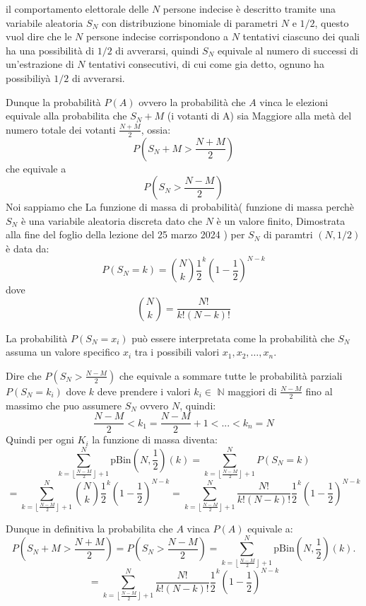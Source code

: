 \documentclass{article}
\begin{document}
il comportamento elettorale delle $N$ persone indecise è descritto tramite una variabile aleatoria $S_N$ con distribuzione binomiale di parametri $N$ e $1/2$, questo vuol dire che le $N$ persone indecise corrispondono a $N$ tentativi ciascuno dei quali ha una possibilità di  $1/2$ di avverarsi, quindi $S_N$ equivale al numero di successi di un'estrazione di $N$ tentativi consecutivi, di cui come gia detto, ognuno ha possibiliyà $1/2$ di avverarsi.

Dunque la probabilità $P(A)$ ovvero la probabilità che $A$ vinca le elezioni  equivale alla probabilita che $ S_N + M$ (i votanti di A) sia
Maggiore alla metà del numero totale dei votanti $\frac{N + M}{2}$, ossia:
\[
P\left( S_N + M > \frac{N + M}{2} \right)
\]
che equivale a
\[
 P\left( S_N > \frac{N - M}{2} \right)
\]
Noi sappiamo che La funzione di massa di probabilità( funzione di massa perchè $S_N$ è una variabile aleatoria discreta dato che $N$ è un valore finito, Dimostrata alla fine del foglio della lezione del 25 marzo 2024 ) per $S_N$ di paramtri $(N,1/2)$ è data da:
\[
P(S_N = k) = \binom{N}{k} \frac{1}{2}^k (1-\frac{1}{2})^{N-k}
\]
dove 
\[
\binom{N}{k} = \frac{N!}{k!(N-k)!}
\]


La probabilità $P(S_N = x_i)$ può essere interpretata come la probabilità che $S_N$ assuma un valore specifico $x_i$ tra i possibili valori $x_1, x_2, \ldots, x_n$. 

Dire che $P\left( S_N > \frac{N - M}{2} \right)$ che equivale a sommare tutte le probabilità parziali $P(S_N = k_i)$ dove $k$ deve prendere i valori $k_i\in$ $\mathbb{N}$ maggiori di
$\frac{N - M}{2}$ fino al massimo che puo assumere $S_N $ ovvero $N$, quindi:
\[
\frac{N - M}{2} < k_1 = \frac{N - M}{2} + 1 < ... < k_n = N
\]
Quindi per ogni $K_i$ la funzione di massa diventa:
\[
\sum_{k = \left\lfloor \frac{N - M}{2} \right\rfloor + 1}^{N} \text{pBin}\left(N, \frac{1}{2}\right)(k) = \sum_{k = \left\lfloor \frac{N - M}{2} \right\rfloor + 1}^{N} P(S_N = k)
\]
\[
=
\sum_{k = \left\lfloor \frac{N - M}{2} \right\rfloor + 1}^{N} \binom{N}{k} \frac{1}{2}^k (1-\frac{1}{2})^{N-k} 
= \sum_{k = \left\lfloor \frac{N - M}{2} \right\rfloor + 1}^{N} \frac{N!}{k!(N-k)!} \frac{1}{2}^k (1-\frac{1}{2})^{N-k}
\]

Dunque in definitiva la probabilita che $A$ vinca $P(A)$ equivale a:
\[
P\left( S_N + M > \frac{N + M}{2} \right) = P\left( S_N > \frac{N - M}{2} \right) = \sum_{k = \left\lfloor \frac{N - M}{2} \right\rfloor + 1}^{N} \text{pBin}\left(N, \frac{1}{2}\right)(k).
\]
\[
=  \sum_{k = \left\lfloor \frac{N - M}{2} \right\rfloor + 1}^{N} \frac{N!}{k!(N-k)!} \frac{1}{2}^k (1-\frac{1}{2})^{N-k}
\]
\end{document}
